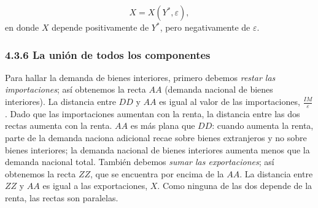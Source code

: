 \documentclass[10pt]{article}
\begin{document}
\begin{multicols*}{2}
\[ X = X(Y^*, \varepsilon), \]
en donde $X$ depende positivamente de $Y^*$, pero negativamente de $\varepsilon$.

\subsubsection{4.3.6 La unión de todos los componentes}
Para hallar la demanda de bienes interiores, primero debemos \textit{restar las importaciones}; así obtenemos la recta $AA$ (demanda nacional de bienes interiores). La distancia entre $DD$ y $AA$ es igual al valor de las importaciones, $\frac{IM}{\varepsilon}$. Dado que las importaciones aumentan con la renta, la distancia entre las dos rectas aumenta con la renta. $AA$ es más plana que $DD$: cuando aumenta la renta, parte de la demanda naciona adicional recae sobre bienes extranjeros y no sobre bienes interiores; la demanda nacional de bienes interiores aumenta menos que la demanda nacional total. También debemos \textit{sumar las exportaciones}; así obtenemos la recta $ZZ$, que se encuentra por encima de la $AA$. La distancia entre $ZZ$ y $AA$ es igual a las exportaciones, $X$. Como ninguna de las dos depende de la renta, las rectas son paralelas.

\begin{center}
\end{center}
\end{multicols*}
\end{document}
